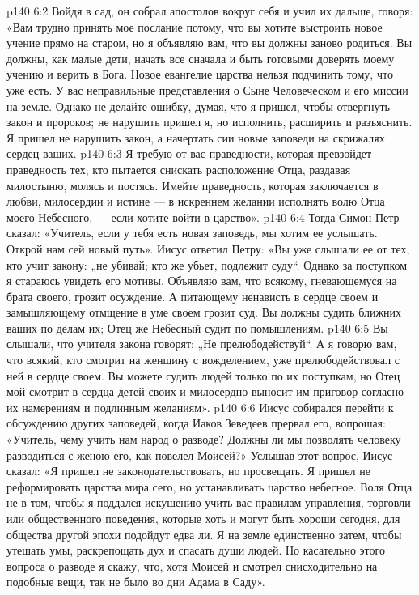 \vs p140 6:2 Войдя в сад, он собрал апостолов вокруг себя и учил их дальше, говоря: «Вам трудно принять мое послание потому, что вы хотите выстроить новое учение прямо на старом, но я объявляю вам, что вы должны заново родиться. Вы должны, как малые дети, начать все сначала и быть готовыми доверять моему учению и верить в Бога. Новое евангелие царства нельзя подчинить тому, что уже есть. У вас неправильные представления о Сыне Человеческом и его миссии на земле. Однако не делайте ошибку, думая, что я пришел, чтобы отвергнуть закон и пророков; не нарушить пришел я, но исполнить, расширить и разъяснить. Я пришел не нарушить закон, а начертать сии новые заповеди на скрижалях сердец ваших.
\vs p140 6:3 Я требую от вас праведности, которая превзойдет праведность тех, кто пытается снискать расположение Отца, раздавая милостыню, молясь и постясь. Имейте праведность, которая заключается в любви, милосердии и истине --- в искреннем желании исполнять волю Отца моего Небесного, --- если хотите войти в царство».
\vs p140 6:4 Тогда Симон Петр сказал: «Учитель, если у тебя есть новая заповедь, мы хотим ее услышать. Открой нам сей новый путь». Иисус ответил Петру: «Вы уже слышали ее от тех, кто учит закону: „не убивай; кто же убьет, подлежит суду“. Однако за поступком я стараюсь увидеть его мотивы. Объявляю вам, что всякому, гневающемуся на брата своего, грозит осуждение. А питающему ненависть в сердце своем и замышляющему отмщение в уме своем грозит суд. Вы должны судить ближних ваших по делам их; Отец же Небесный судит по помышлениям.
\vs p140 6:5 Вы слышали, что учителя закона говорят: „Не прелюбодействуй“. А я говорю вам, что всякий, кто смотрит на женщину с вожделением, уже прелюбодействовал с ней в сердце своем. Вы можете судить людей только по их поступкам, но Отец мой смотрит в сердца детей своих и милосердно выносит им приговор согласно их намерениям и подлинным желаниям».
\vs p140 6:6 Иисус собирался перейти к обсуждению других заповедей, когда Иаков Зеведеев прервал его, вопрошая: «Учитель, чему учить нам народ о разводе? Должны ли мы позволять человеку разводиться с женою его, как повелел Моисей?» Услышав этот вопрос, Иисус сказал: «Я пришел не законодательствовать, но просвещать. Я пришел не реформировать царства мира сего, но устанавливать царство небесное. Воля Отца не в том, чтобы я поддался искушению учить вас правилам управления, торговли или общественного поведения, которые хоть и могут быть хороши сегодня, для общества другой эпохи подойдут едва ли. Я на земле единственно затем, чтобы утешать умы, раскрепощать дух и спасать души людей. Но касательно этого вопроса о разводе я скажу, что, хотя Моисей и смотрел снисходительно на подобные вещи, так не было во дни Адама в Саду».
